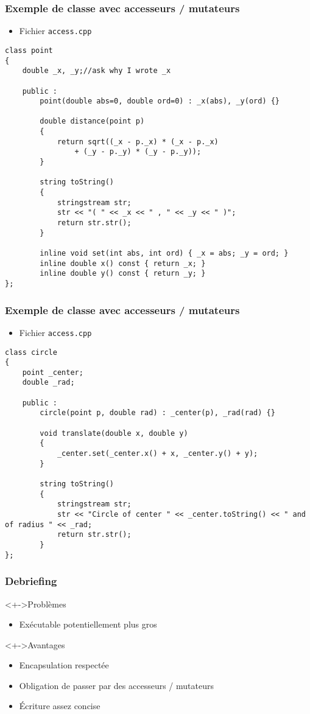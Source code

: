 \begin{frame}[containsverbatim]
\frametitle{Exemple de classe avec accesseurs / mutateurs}
\begin{itemize}
\item Fichier \texttt{access.cpp}
\end{itemize}
\begin{lstlisting}
class point
{	
	double _x, _y;//ask why I wrote _x

	public :		
		point(double abs=0, double ord=0) : _x(abs), _y(ord) {}

		double distance(point p)
		{
			return sqrt((_x - p._x) * (_x - p._x) 
				+ (_y - p._y) * (_y - p._y));
		}

		string toString()
		{
			stringstream str;
			str << "( " << _x << " , " << _y << " )";		
			return str.str();
		}

		inline void set(int abs, int ord) { _x = abs; _y = ord; }
		inline double x() const { return _x; }
		inline double y() const { return _y; }
};
\end{lstlisting}
\end{frame}

\begin{frame}[containsverbatim]
\frametitle{Exemple de classe avec accesseurs / mutateurs}
\begin{itemize}
\item Fichier \texttt{access.cpp}
\end{itemize}
\begin{lstlisting}
class circle
{
	point _center;
	double _rad;

	public :
		circle(point p, double rad) : _center(p), _rad(rad) {}		

		void translate(double x, double y)
		{
			_center.set(_center.x() + x, _center.y() + y);
		}

		string toString()
		{			
			stringstream str;
			str << "Circle of center " << _center.toString() << " and of radius " << _rad;
			return str.str();
		}
};
\end{lstlisting}
\end{frame}

\begin{frame}
\frametitle{Debriefing}
\begin{alertblock}<+->{Problèmes}
	\begin{itemize}[<+->]
	\item Exécutable potentiellement plus gros
	\end{itemize}
\end{alertblock}
\begin{block}<+->{Avantages}
	\begin{itemize}[<+->]
	\item Encapsulation respectée
	\item Obligation de passer par des accesseurs / mutateurs
	\item Écriture assez concise
	\end{itemize}
\end{block}
\end{frame}

